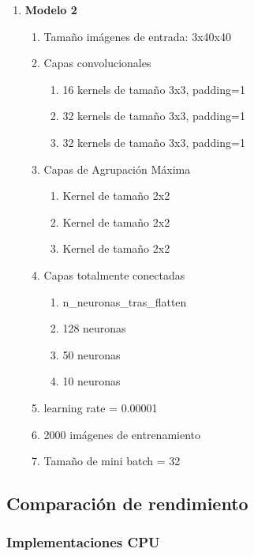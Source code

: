 \begin{enumerate}
	\item \textbf{Modelo 2}
	\begin{enumerate}[label=\textbullet, nosep]
		\item Tamaño imágenes de entrada: 3x40x40
		\item Capas convolucionales
		\begin{enumerate}[label=\textbullet, nosep]
			\item 16 kernels de tamaño 3x3, padding=1
			\item 32 kernels de tamaño 3x3, padding=1
			\item 32 kernels de tamaño 3x3, padding=1
		\end{enumerate}
		\item Capas de Agrupación Máxima
		\begin{enumerate}[label=\textbullet, nosep]
			\item Kernel de tamaño 2x2
			\item Kernel de tamaño 2x2
			\item Kernel de tamaño 2x2
		\end{enumerate}
		\item Capas totalmente conectadas
		\begin{enumerate}[label=\textbullet, nosep]
			\item n\_neuronas\_tras\_flatten
			\item 128 neuronas
			\item 50 neuronas
			\item 10 neuronas
		\end{enumerate}
		\item learning rate = 0.00001
		\item 2000 imágenes de entrenamiento
		\item Tamaño de mini batch = 32
	\end{enumerate}	
\end{enumerate}

\subsection{Comparación de rendimiento}

\subsubsection{Implementaciones CPU}

